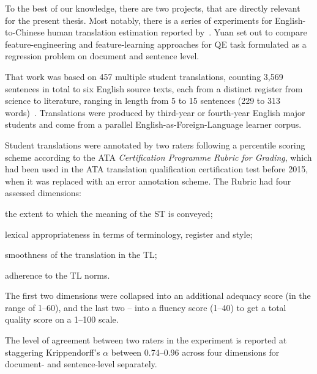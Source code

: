 To the best of our knowledge, there are two projects, that are directly relevant for the present thesis. 
\label{pg:yuan_previous}
Most notably, there is a series of experiments for English-to-Chinese human translation estimation reported by~\citet{Yuan2016, Yuan2018, Yuan2020}.
Yuan set out to compare feature-engineering and feature-learning approaches for QE task formulated as a regression problem on document and sentence level.

That work was based on 457 multiple student translations, counting 3,569 sentences in total to six English source texts, each from a distinct register from science to literature, ranging in length from 5 to 15 sentences (229 to 313 words)~\cite{Yuan2018}. Translations were produced by third-year or fourth-year English major students and come from a parallel English-as-Foreign-Language learner corpus.

Student translations were annotated by two raters following a percentile scoring scheme according to the \gls{ATA} \textit{Certification Programme Rubric for Grading}, which had been used in the ATA translation qualification certification test before 2015, when it was replaced with an error annotation scheme. The Rubric had four assessed dimensions:

\begin{description}\compresslist{}
	\item [1. usefulness] the extent to which the meaning of the ST is conveyed;
	\item [2. terminology] lexical appropriateness in terms of terminology, register and style;
	\item [3. idiomatic writing] smoothness of the translation in the TL;
	\item [4. target mechanics] adherence to the TL norms.
\end{description}

The first two dimensions were collapsed into an additional adequacy score (in the range of 1--60), and the last two -- into a fluency score (1--40) to get a total quality score on a 1--100 scale.


The level of agreement between two raters in the experiment is reported at staggering Krippendorff's $\alpha$ between 0.74--0.96 across four dimensions for document- and sentence-level separately.

